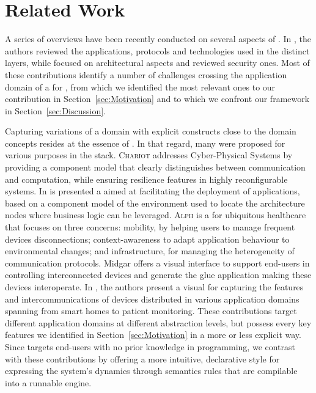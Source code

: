 \section{Related Work}
\label{sec:RW}

A series of overviews have been recently conducted on several aspects of \IOT. In \cite{alfuqaha-15,xu-14a}, the authors reviewed the applications, protocols and technologies used in the distinct \IOT layers, while \cite{singh-14,gubbi-13} focused on architectural aspects and \cite{tan-10,xu-14b} reviewed security ones. Most of these contributions identify a number of challenges crossing the application domain of a \DSL for \IOT, from which we identified the most relevant ones to our contribution in Section~\ref{sec:Motivation} and to which we confront our framework in Section~\ref{sec:Discussion}.

Capturing variations of a domain with explicit constructs close to the domain concepts resides at the essence of \DSLS. In that regard, many \DSLS were proposed for various purposes in the \IOT stack. \textsc{Chariot} \cite{pradhan-15} addresses Cyber-Physical Systems by providing a component model that clearly distinguishes between communication and computation, while ensuring resilience features in highly reconfigurable systems. In \cite{brandtzaeg-12} is presented a \DSL aimed at facilitating the deployment of applications, based on a component model of the environment used to locate the architecture nodes where business logic can be leveraged. \textsc{Alph} \cite{munnelly-08} is a \DSL for ubiquitous healthcare that focuses on three concerns: mobility, by helping users to manage frequent devices disconnections; context-awareness to adapt application behaviour to environmental changes; and infrastructure, for managing the heterogeneity of communication protocols. Midgar \cite{garcia-14} offers a visual interface to support end-users in controlling interconnected devices and generate the glue application making these devices interoperate. In \cite{salihbegovic-15}, the authors present a visual \DSL for capturing the features and intercommunications of devices distributed in various application domains spanning from smart homes to patient monitoring. These contributions target different application domains at different abstraction levels, but possess every key features we identified in Section~\ref{sec:Motivation} in a more or less explicit way. Since \IOTDSL targets end-users with no prior knowledge in programming, we contrast with these contributions by offering a more intuitive, declarative style for expressing the system's dynamics through semantics rules that are compilable into a runnable \CEP engine.

